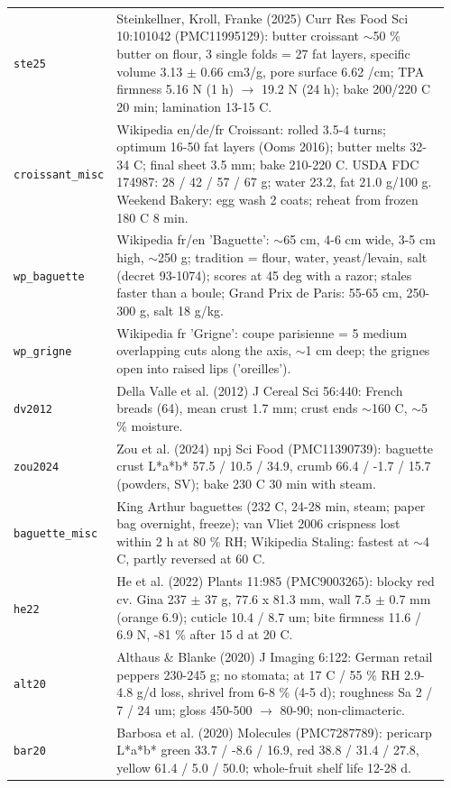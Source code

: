 \documentclass[10.5pt,a4paper]{article}
\begin{document}
{\begin{longtable}{@{}p{0.16\linewidth}p{0.8\linewidth}@{}}
\texttt{ste25} & Steinkellner, Kroll, Franke (2025) Curr Res Food Sci 10:101042 (PMC11995129): butter croissant $\sim$50 \% butter on flour, 3 single folds = 27 fat layers, specific volume 3.13 $\pm$ 0.66 cm3/g, pore surface 6.62 /cm; TPA firmness 5.16 N (1 h) $\to$ 19.2 N (24 h); bake 200/220 C 20 min; lamination 13-15 C. \\
\texttt{croissant\_\allowbreak{}misc} & Wikipedia en/de/fr Croissant: rolled 3.5-4 turns; optimum 16-50 fat layers (Ooms 2016); butter melts 32-34 C; final sheet 3.5 mm; bake 210-220 C. USDA FDC 174987: 28 / 42 / 57 / 67 g; water 23.2, fat 21.0 g/100 g. Weekend Bakery: egg wash 2 coats; reheat from frozen 180 C 8 min. \\
\texttt{wp\_\allowbreak{}baguette} & Wikipedia fr/en 'Baguette': $\sim$65 cm, 4-6 cm wide, 3-5 cm high, $\sim$250 g; tradition = flour, water, yeast/levain, salt (decret 93-1074); scores at 45 deg with a razor; stales faster than a boule; Grand Prix de Paris: 55-65 cm, 250-300 g, salt 18 g/kg. \\
\texttt{wp\_\allowbreak{}grigne} & Wikipedia fr 'Grigne': coupe parisienne = 5 medium overlapping cuts along the axis, $\sim$1 cm deep; the grignes open into raised lips ('oreilles'). \\
\texttt{dv2012} & Della Valle et al. (2012) J Cereal Sci 56:440: French breads (64), mean crust 1.7 mm; crust ends $\sim$160 C, $\sim$5 \% moisture. \\
\texttt{zou2024} & Zou et al. (2024) npj Sci Food (PMC11390739): baguette crust L*a*b* 57.5 / 10.5 / 34.9, crumb 66.4 / -1.7 / 15.7 (powders, SV); bake 230 C 30 min with steam. \\
\texttt{baguette\_\allowbreak{}misc} & King Arthur baguettes (232 C, 24-28 min, steam; paper bag overnight, freeze); van Vliet 2006 crispness lost within 2 h at 80 \% RH; Wikipedia Staling: fastest at $\sim$4 C, partly reversed at 60 C. \\
\texttt{he22} & He et al. (2022) Plants 11:985 (PMC9003265): blocky red cv. Gina 237 $\pm$ 37 g, 77.6 x 81.3 mm, wall 7.5 $\pm$ 0.7 mm (orange 6.9); cuticle 10.4 / 8.7 um; bite firmness 11.6 / 6.9 N, -81 \% after 15 d at 20 C. \\
\texttt{alt20} & Althaus \& Blanke (2020) J Imaging 6:122: German retail peppers 230-245 g; no stomata; at 17 C / 55 \% RH 2.9-4.8 g/d loss, shrivel from 6-8 \% (4-5 d); roughness Sa 2 / 7 / 24 um; gloss 450-500 $\to$ 80-90; non-climacteric. \\
\texttt{bar20} & Barbosa et al. (2020) Molecules (PMC7287789): pericarp L*a*b* green 33.7 / -8.6 / 16.9, red 38.8 / 31.4 / 27.8, yellow 61.4 / 5.0 / 50.0; whole-fruit shelf life 12-28 d. \\

\end{longtable}}
\end{document}
